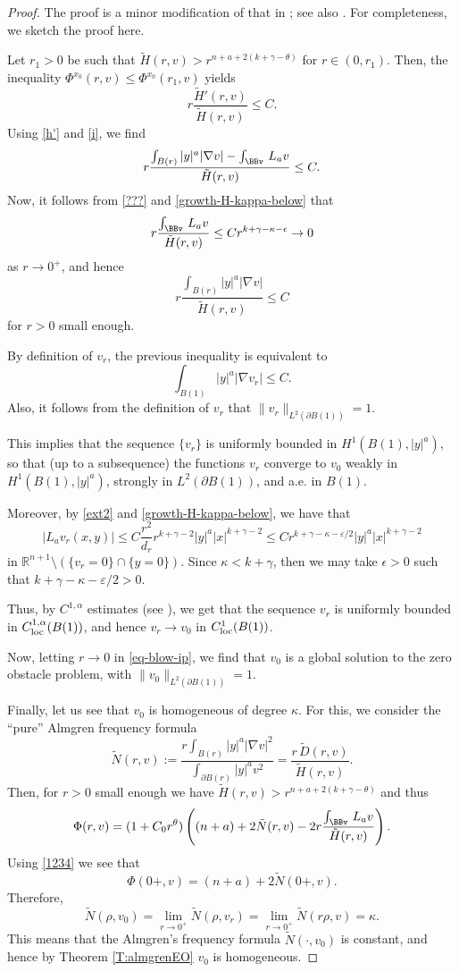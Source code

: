 \documentclass[11pt]{amsart}
\theoremstyle{plain}
\numberwithin{equation}{section}
\begin{document}
\begin{proof}
The proof is a minor modification of that in \cite[Lemma 6.2]{CSS}; see also \cite[Proposition 5.3]{BFR}.
For completeness, we sketch the proof here.

Let $r_1>0$ be such that $\tilde H(r,v)>r^{n+a+2(k+\gamma-\theta)}$ for $r\in(0,r_1)$.
Then, the inequality $\Phi^{x_0}(r,v)\leq \Phi^{x_0}(r_1,v)$ yields
\[r\frac{\tilde H'(r,v)}{\tilde H(r,v)}\leq C.\]
Using \eqref{h'} and \eqref{i}, we find
\[r\frac{\int_{B(r)}|y|^a|\nabla v|-\int_\BBv\,L_av}{\tilde H(r,v)}\leq C.\]
Now, it follows from \eqref{???} and \eqref{growth-H-kappa-below} that
\begin{equation}\label{1234}
r\frac{\int_\BBv\,L_av}{\tilde H(r,v)}\leq Cr^{k+\gamma-\kappa-\epsilon}\rightarrow0
\end{equation}
as $r\to0^+$, and hence
\[r\frac{\int_{B(r)}|y|^a|\nabla v|}{\tilde H(r,v)}\leq C\]
for $r>0$ small enough.

By definition of $v_r$, the previous inequality is equivalent to
\[\int_{B(1)}|y|^a|\nabla v_r|\leq C.\]
Also, it follows from the definition of $v_r$ that $\|v_r\|_{L^2(\partial B(1))}=1$.

This implies that the sequence $\{v_r\}$ is uniformly bounded in $H^1({B(1)},|y|^a)$, so that (up to a subsequence) the functions $v_r$ converge to $v_0$ weakly in $H^1({B(1)},|y|^a)$, strongly in $L^2(\partial{B(1)})$, and a.e. in ${B(1)}$.

Moreover, by \eqref{ext2} and \eqref{growth-H-kappa-below}, we have that
\begin{equation}\label{eq-blow-ip}
|L_a v_r(x,y)|\leq C\frac{r^2}{d_r} r^{k+\gamma-2}|y|^a|x|^{k+\gamma-2}\leq Cr^{k+\gamma-\kappa-\varepsilon/2}|y|^a|x|^{k+\gamma-2}
\end{equation}
in ${\mathbb R}^{n+1}\setminus(\{v_r=0\}\cap \{y=0\})$.
Since $\kappa<k+\gamma$, then we may take $\epsilon>0$ such that $k+\gamma-\kappa-\varepsilon/2>0$.

Thus, by $C^{1,\alpha}$ estimates (see \cite{CSS}), we get that the sequence $v_r$ is uniformly bounded in $C^{1,\alpha}_{\rm loc}({B(1)})$, and hence $v_r\to v_0$ in $C^1_{\rm loc}({B(1)})$.

Now, letting $r\to0$ in \eqref{eq-blow-ip}, we find that $v_0$ is a global solution to the zero obstacle problem, with $\|v_0\|_{L^2(\partial B(1))}=1$.

Finally, let us see that $v_0$ is homogeneous of degree $\kappa$.
For this, we consider the ``pure'' Almgren frequency formula
\[\tilde N(r,v):=\frac{r\int_{B(r)}|y|^a|\nabla v|^2}{\int_{\partial{B(r)}}|y|^av^2}=\frac{r\,\tilde D(r,v)}{\tilde H(r,v)}.\]
Then, for $r>0$ small enough we have $\tilde H(r,v)>r^{n+a+2(k+\gamma-\theta)}$ and thus
\[\Phi(r,v)=(1+C_0r^\theta)\left((n+a)+2\tilde N(r,v)-2r\frac{\int_\BBv\,L_av}{\tilde H(r,v)}\right).\]
Using \eqref{1234} we see that
\[\Phi(0+,v)=(n+a)+2\tilde N(0+,v).\]
Therefore,
\[\tilde N(\rho,v_0)=\lim_{r\to0^+}\tilde N(\rho,v_r)=\lim_{r\to0^+}\tilde N(r\rho,v)=\kappa.\]
This means that the Almgren's frequency formula $\tilde N(\cdot,v_0)$ is constant, and hence by Theorem \ref{T:almgrenEO} $v_0$ is homogeneous.
\end{proof}
\end{document}
